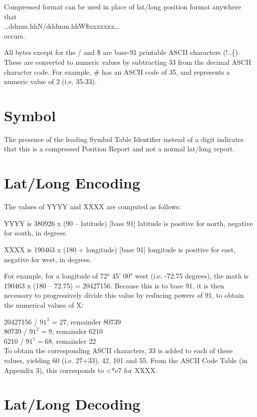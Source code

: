 Compressed format can be used in place of lat/long position format
anywhere that \\
…ddmm.hhN/dddmm.hhW\$xxxxxxx…  \\
occurs.

All bytes except for the / and \$ are base-91 printable ASCII
characters (!..\{). These are converted to numeric values by
subtracting 33 from the decimal ASCII character code. For example, \#
has an ASCII code of 35, and represents a numeric value of 2
(i.e. 35-33).

\section {Symbol}

The presence of the leading Symbol Table Identifier instead of a digit
indicates that this is a compressed Position Report and not a normal lat/long
report.


\section{Lat/Long Encoding}

The values of YYYY and XXXX are computed as follows:

YYYY is 380926 x (90 – latitude) [base 91]
latitude is positive for north, negative for south, in degrees.

XXXX is 190463 x (180 + longitude) [base 91]
longitude is positive for east, negative for west, in degrees.

For example, for a longitude of 72° 45' 00" west (i.e. -72.75
degrees), the math is 190463 x (180 – 72.75) = 20427156. Because this
is to base 91, it is then necessary to progressively divide this value
by reducing powers of 91, to obtain the numerical values of X:

20427156 / $91^{3}$ = 27, remainder 80739 \\
80739 / $91^{2} = 9$, remainder 6210 \\
6210 / $91^{1} = 68$, remainder 22 \\



To obtain the corresponding ASCII characters, 33 is added to each of
these values, yielding 60 (i.e. 27+33), 42, 101 and 55. From the ASCII
Code Table (in Appendix 3), this corresponds to <*e7 for XXXX.

\section{Lat/Long Decoding}

